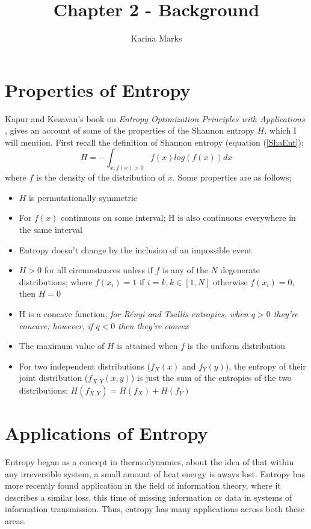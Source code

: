 \documentclass{article}
\title{Chapter 2 - Background}
\author{Karina Marks}
\begin{document}
\maketitle



\section{Properties of Entropy}

Kapur and Kesavan's book on \textit{Entropy Optimization Principles with Applications} \cite{paper8}, gives an account of some of the properties of the Shannon entropy $H$, which I will mention. First recall the definition of Shannon entropy (equation (\ref{ShaEnt});
\begin{equation}
H = - \int_{x : f(x) > 0} f(x) log(f(x)) dx \nonumber
\end{equation}
where $f$ is the density of the distribution of $x$. Some properties are as follows; 
\begin{itemize}
\item $H$ is permutationally symmetric
\item For $f(x)$ continuous on some interval; H is also continuous everywhere in the same interval
\item Entropy doesn't change by the inclusion of an impossible event
\item $H > 0$ for all circumstances unless if $f$ is any of the $N$ degenerate distributions; where $f(x_{i}) = 1$ if $i = k, k \in [1, N]$ otherwise $f(x_{i}) = 0$, then $H=0$
\item H is a concave function, \textit{for R\'enyi and Tsallis entropies, when $q > 0$ they're concave; however, if $q<0$ then they're convex}
\item The maximum value of $H$ is attained when $f$ is the uniform distribution
\item For two independent distributions ($f_{X}(x)$ and $f_{Y}(y)$), the entropy of their joint distribution ($f_{X,Y}(x,y)$) is just the sum of the entropies of the two distributions; $H(f_{X,Y}) = H(f_{X}) + H(f_{Y})$
\end{itemize}


\section{Applications of Entropy}

Entropy began as a concept in thermodynamics, about the idea of that within any irreversible system, a small amount of heat energy is aways lost. Entropy has more recently found application in the field of information theory, where it describes a similar loss, this time of missing information or data in systems of information transmission. Thus, entropy has many applications across both these areas.
\end{document}

